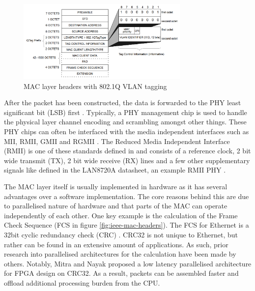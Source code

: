 \begin{figure}[h]
    \centering
    \includegraphics[width=0.75\textwidth]{Images/vlan_tagging_packet.png}
    \caption[MAC layer headers with 802.1Q VLAN tagging]{MAC layer headers with 802.1Q VLAN tagging\cite{IEEE802.1q-2005}}
    \label{fig:ieee-dot1q-headers}
\end{figure}



\noindent After the packet has been constructed, the data is forwarded to the PHY least significant bit (LSB) first \cite{IEEE802.3-2012}. Typically, a PHY management chip is used to handle the physical layer channel encoding and scrambling amongst other things. 
These PHY chips can often be interfaced with the media independent interfaces such as MII, RMII, GMII and RGMII \cite{OptimisedEthernetMAC}. The Reduced Media Independent Interface (RMII) is one of these standards defined in \cite{IEEE802.3-2012} and consists of a reference clock, 2 bit wide transmit (TX), 2 bit wide receive (RX) lines and a few other supplementary signals like defined in the LAN8720A datasheet, an example RMII PHY \cite{LAN8720ADatasheet}.


The MAC layer itself is usually implemented in hardware as it has several advantages over a software implementation. The core reasons behind this are due to parallelised nature of hardware and that parts of the MAC can operate independently \cite{reducedEtherentMacFPGA} of each other. One key example is the calculation of the Frame Check Sequence (FCS in figure \ref{fig:ieee-mac-headers}). The FCS for Ethernet is a 32bit cyclic redundancy check (CRC) \cite{IEEE802.3-2012}. CRC32 is not unique to Ethernet, but rather can be found in an extensive amount of applications. As such, prior research into parallelised architectures for the calculation have been made by others. Notably, Mitra and Nayak \cite{ParallelCRC} proposed a low latency parallelised architecture for FPGA design on CRC32. As a result, packets can be assembled faster and offload additional processing burden from the CPU. 



